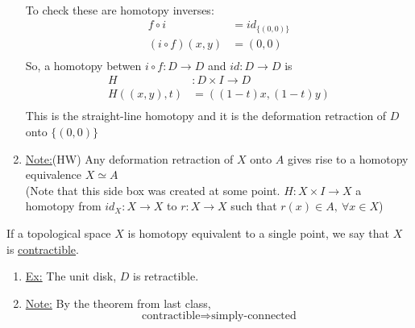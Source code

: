 \documentclass[../notes.tex]{subfiles}
\begin{document}
\begin{enumerate}
\begin{align*}
            \end{align*}
            To check these are homotopy inverses:
            \begin{align*}
                f\circ i &= id_{\{(0,0)\}}\\
                (i\circ f)(x,y)&=(0,0)\\
            \end{align*}
            So, a homotopy betwen $i\circ f: D \rightarrow D$ and $id: D\rightarrow D$ is
            \begin{align*}
                H&: D\times I \rightarrow D\\
                H((x,y), t)&=((1-t)x, (1-t)y)\\
            \end{align*}
            This is the straight-line homotopy and it is the deformation retraction of $D$
            onto $\{(0,0)\}$
        \item \underline{Note:}(HW) Any deformation retraction of $X$ onto $A$
            gives rise to a homotopy equivalence $X\simeq A$\\
            (Note that this side box was created at some point.
            $H:X\times I \rightarrow X$ a homotopy from $id_X:X\rightarrow X$
            to $r:X\rightarrow X$ such that $r(x)\in A,\ \forall x\in X$)
    \end{enumerate}
    \begin{definition}
        If a topological space $X$ is homotopy equivalent to a single point, we say that $X$ is \underline{contractible}.
    \end{definition}
    \begin{enumerate}
        \item\underline{Ex:} The unit disk, $D$ is retractible.
        \item \underline{Note:} By the theorem from last class,
            \[
                \text{contractible}\Rightarrow \text{simply-connected}
            \]
    \end{enumerate}
\end{document}
